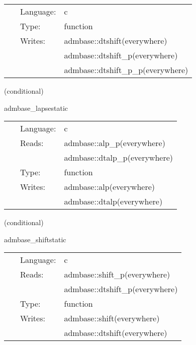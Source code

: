  \begin{tabular*}{160mm}{cll} 
~ & Language:  & c \\ 
~ & Type:  & function \\ 
~ & Writes:  & admbase::dtshift(everywhere) \\ 
~& ~ &admbase::dtshift\_p(everywhere)\\ 
~& ~ &admbase::dtshift\_p\_p(everywhere)\\ 
\end{tabular*} 


\vspace{5mm}

   (conditional) 

\hspace{5mm} admbase\_lapsestatic 

\hspace{5mm}{\it copy the lapse to the current time level } 


\hspace{5mm}

 \begin{tabular*}{160mm}{cll} 
~ & Language:  & c \\ 
~ & Reads:  & admbase::alp\_p(everywhere) \\ 
~& ~ &admbase::dtalp\_p(everywhere)\\ 
~ & Type:  & function \\ 
~ & Writes:  & admbase::alp(everywhere) \\ 
~& ~ &admbase::dtalp(everywhere)\\ 
\end{tabular*} 


\vspace{5mm}

   (conditional) 

\hspace{5mm} admbase\_shiftstatic 

\hspace{5mm}{\it copy the shift to the current time level } 


\hspace{5mm}

 \begin{tabular*}{160mm}{cll} 
~ & Language:  & c \\ 
~ & Reads:  & admbase::shift\_p(everywhere) \\ 
~& ~ &admbase::dtshift\_p(everywhere)\\ 
~ & Type:  & function \\ 
~ & Writes:  & admbase::shift(everywhere) \\ 
~& ~ &admbase::dtshift(everywhere)\\ 
\end{tabular*} 


